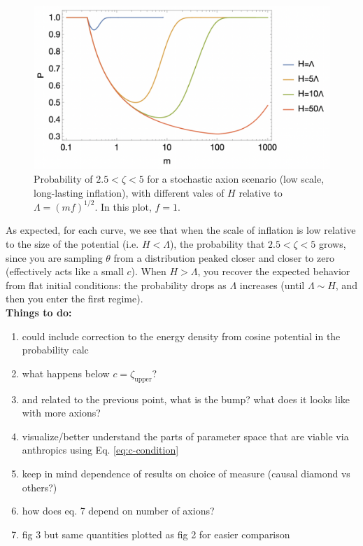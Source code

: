 \documentclass{article}
\begin{document}
\begin{figure}[h]
    \centering
    \includegraphics[width=1\linewidth]{figs/low-scale-inf-prob.jpeg}
    \caption{Probability of $2.5<\zeta<5$ for a stochastic axion scenario (low scale, long-lasting inflation), with different vales of $H$ relative to $\Lambda = (mf)^{1/2}$. In this plot, $f=1$.}
    \label{fig:low-scale-inf-prob}
\end{figure}

As expected, for each curve, we see that when the scale of inflation is low relative to the size of the potential (i.e. $H<\Lambda$), the probability that $2.5<\zeta<5$ grows, since you are sampling $\theta$ from a distribution peaked closer and closer to zero (effectively acts like a small $c$). When $H>\Lambda$, you recover the expected behavior from flat initial conditions: the probability drops as $\Lambda$ increases (until $\Lambda \sim H$, and then you enter the first regime). \\

\color{red}\noindent \textbf{Things to do:}
\begin{enumerate}
    \item could include correction to the energy density from cosine potential in the probability calc
    \item what happens below $c=\zeta_\text{upper}$?
    \item and related to the previous point, what is the bump? what does it looks like with more axions?
    \item visualize/better understand the parts of parameter space that are viable via anthropics using Eq. \eqref{eq:c-condition}
    \item keep in mind dependence of results on choice of measure (causal diamond vs others?)
    \item how does eq. 7 depend on number of axions?
    \item fig 3 but same quantities plotted as fig 2 for easier comparison
\end{enumerate}\color{black}
\end{document}
